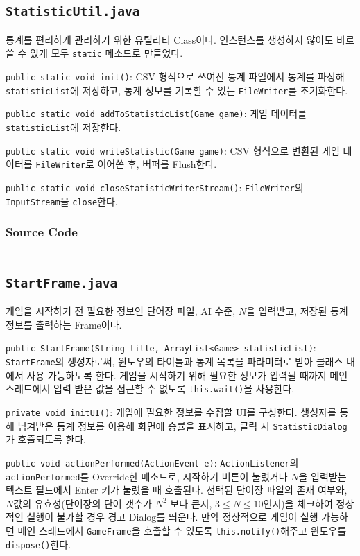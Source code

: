 \newpage
\subsection{\texttt{StatisticUtil.java}}
통계를 편리하게 관리하기 위한 유틸리티 Class이다.
인스턴스를 생성하지 않아도 바로 쓸 수 있게 모두 \texttt{static} 메소드로 만들었다.

\texttt{public static void init()}:
CSV 형식으로 쓰여진 통계 파일에서 통계를 파싱해 \texttt{statisticList}에 저장하고,
통계 정보를 기록할 수 있는 \texttt{FileWriter}를 초기화한다.

\texttt{public static void addToStatisticList(Game game)}:
게임 데이터를 \texttt{statisticList}에 저장한다.

\texttt{public static void writeStatistic(Game game)}:
CSV 형식으로 변환된 게임 데이터를 \texttt{FileWriter}로 이어쓴 후, 버퍼를 Flush한다.

\texttt{public static void closeStatisticWriterStream()}:
\texttt{FileWriter}의 \texttt{InputStream}을 \texttt{close}한다.

\subsubsection{Source Code}
\inputminted[fontsize=\scriptsize]{java}{../../src/main/java/ywrhee/project/StatisticUtil.java}

\newpage
\subsection{\texttt{StartFrame.java}}
게임을 시작하기 전 필요한 정보인 단어장 파일, AI 수준, $N$을 입력받고, 저장된 통계 정보를 출력하는 Frame이다.

\texttt{public StartFrame(String title, ArrayList<Game> statisticList)}:
\texttt{StartFrame}의 생성자로써, 윈도우의 타이틀과 통계 목록을 파라미터로 받아 클래스 내에서 사용 가능하도록 한다.
게임을 시작하기 위해 필요한 정보가 입력될 때까지 메인 스레드에서 입력 받은 값을 접근할 수 없도록 \texttt{this.wait()}을 사용한다.

\texttt{private void initUI()}:
게임에 필요한 정보를 수집할 UI를 구성한다.
생성자를 통해 넘겨받은 통계 정보를 이용해 화면에 승률을 표시하고, 클릭 시 \texttt{StatisticDialog}가 호출되도록 한다.

\texttt{public void actionPerformed(ActionEvent e)}:
\texttt{ActionListener}의 \texttt{actionPerformed}를 Override한 메소드로,
시작하기 버튼이 눌렸거나 $N$을 입력받는 텍스트 필드에서 Enter 키가 눌렸을 때 호출된다.
선택된 단어장 파일의 존재 여부와, $N$값의 유효성(단어장의 단어 갯수가 $N^2$ 보다 큰지, $3 \leq N \leq 10$인지)을 체크하여 정상적인 실행이 불가할 경우 경고 Dialog를 띄운다.
만약 정상적으로 게임이 실행 가능하면 메인 스레드에서 \texttt{GameFrame}을 호출할 수 있도록 \texttt{this.notify()}해주고 윈도우를 \texttt{dispose()}한다.

